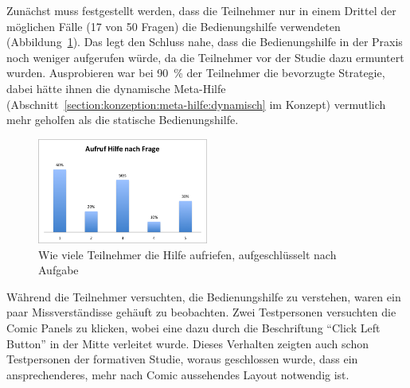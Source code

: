\documentclass[
	headsepline,
	footsepline,
	fontsize=12pt,
	bibliography=totoc
]{scrbook}
\begin{document}
Zunächst muss festgestellt werden, dass die Teilnehmer nur in einem Drittel der möglichen Fälle (17 von 50 Fragen) die Bedienungshilfe verwendeten (Abbildung~\ref{figure:result-helptask}). Das legt den Schluss nahe, dass die Bedienungshilfe in der Praxis noch weniger aufgerufen würde, da die Teilnehmer vor der Studie dazu ermuntert wurden. Ausprobieren war bei 90~\% der Teilnehmer die bevorzugte Strategie, dabei hätte ihnen die dynamische Meta-Hilfe (Abschnitt~\ref{section:konzeption:meta-hilfe:dynamisch} im Konzept) vermutlich mehr geholfen als die statische Bedienungshilfe.

\begin{figure}[htbp]
   \centering
   \includegraphics[width=0.5\textwidth]{images/evaluation-result-helptask.png}
   \caption{Wie viele Teilnehmer die Hilfe aufriefen, aufgeschlüsselt nach Aufgabe}
   \label{figure:result-helptask}
\end{figure}



Während die Teilnehmer versuchten, die Bedienungshilfe zu verstehen, waren ein paar Missverständisse gehäuft zu beobachten. Zwei Testpersonen versuchten die Comic Panels zu klicken, wobei eine dazu durch die Beschriftung \enquote{Click Left Button} in der Mitte verleitet wurde. Dieses Verhalten zeigten auch schon Testpersonen der formativen Studie, woraus geschlossen wurde, dass ein ansprechenderes, mehr nach Comic aussehendes Layout notwendig ist.
\end{document}
